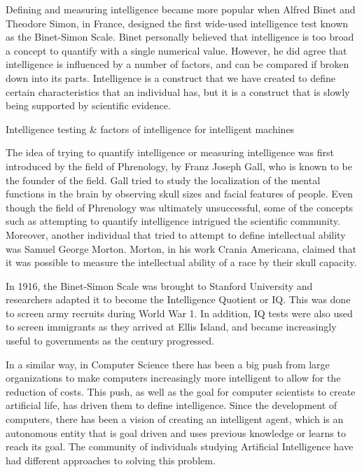 \documentclass[11pt]{article}
\begin{document}
\par Defining and measuring intelligence became more popular when Alfred Binet and Theodore Simon, in France, designed the first wide-used intelligence test known as the Binet-Simon Scale. Binet personally believed that intelligence is too broad a concept to quantify with a single numerical value. However, he did agree that intelligence is influenced by a number of factors, and can be compared if broken down into its parts. Intelligence is a construct that we have created to define certain characteristics that an individual has, but it is a construct that is slowly being supported by scientific evidence.

\begin{center}
	{\large Intelligence testing \& factors of intelligence for intelligent machines\par}
\end{center}

\par The idea of trying to quantify intelligence or measuring intelligence was first introduced by the field of Phrenology, by Franz Joseph Gall, who is known to be the founder of the field. Gall tried to study the localization of the mental functions in the brain by observing skull sizes and facial features of people. Even though the field of Phrenology was ultimately unsuccessful, some of the concepts such as attempting to quantify intelligence intrigued the scientific community. Moreover, another individual that tried to attempt to define intellectual ability was Samuel George Morton. Morton, in his work Crania Americana, claimed that it was possible to measure the intellectual ability of a race by their skull capacity. 

\par In 1916, the Binet-Simon Scale was brought to Stanford University and researchers adapted it to become the Intelligence Quotient or IQ. This was done to screen army recruits during World War 1. In addition, IQ tests were also used to screen immigrants as they arrived at Ellis Island, and became increasingly useful to governments as the century progressed.

\par In a similar way, in Computer Science there has been a big push from large organizations to make computers increasingly more intelligent to allow for the reduction of costs. This push, as well as the goal for computer scientists to create artificial life, has driven them to define intelligence. Since the development of computers, there has been a vision of creating an intelligent agent, which is an autonomous entity that is goal driven and uses previous knowledge or learns to reach its goal. The community of individuals studying Artificial Intelligence have had different approaches to solving this problem.
\end{document}
